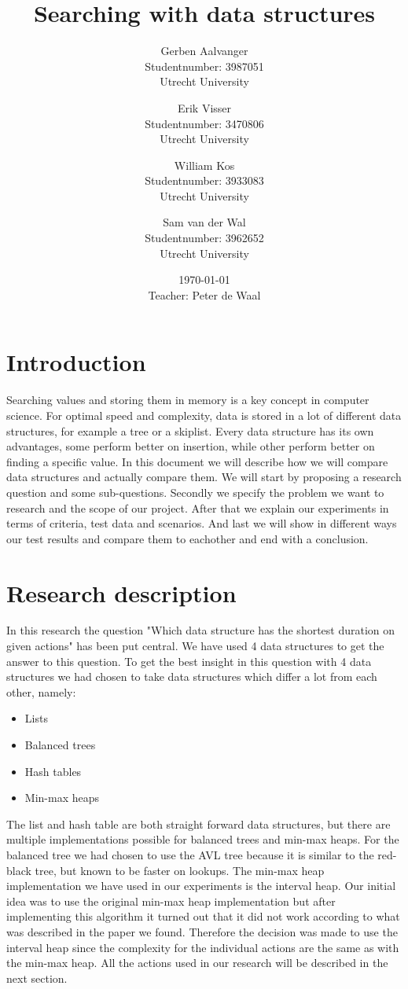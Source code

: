 \documentclass{article}
\title{Searching with data structures}
\author{
		Gerben Aalvanger\\ 
	        	Studentnumber: 3987051 \\
	        	Utrecht University
			\and
		Erik Visser\\
	        	Studentnumber: 3470806 \\
	        	Utrecht University
	        	\and
	        	William Kos\\
	        	Studentnumber: 3933083\\
	        	Utrecht University\\
	        	\and
	        	Sam van der Wal\\
	        	Studentnumber: 3962652\\
	        	Utrecht University}
\date{\today \\Teacher: Peter de Waal}
\begin{document}
\maketitle
\section{Introduction}
Searching values and storing them in memory is a key concept in computer science. For optimal speed and complexity, data is stored in a lot of different data structures, for example a tree or a skiplist. Every data structure has its own advantages, some perform better on insertion, while other perform better on finding a specific value. In this document we will describe how we will compare data structures and actually compare them. We will start by proposing a research question and some sub-questions. Secondly we specify the problem we want to research and the scope of our project. After that we explain our experiments in terms of criteria, test data and scenarios. And last we will show in different ways our test results and compare them to eachother and end with a conclusion. 

\section{Research description}
In this research the question "Which data structure has the shortest duration on given actions" has been put central. We have used 4 data structures to get the answer to this question. To get the best insight in this question with 4 data structures we had chosen to take data structures which differ a lot from each other, namely:
\begin{itemize}
\item Lists
\item Balanced trees
\item Hash tables
\item Min-max heaps
\end{itemize}
The list and hash table are both straight forward data structures, but there are multiple implementations possible for balanced trees and min-max heaps. For the balanced tree we had chosen to use the AVL tree because it is similar to the red-black tree, but known to be faster on lookups. The min-max heap implementation we have used in our experiments is the interval heap. Our initial idea was to use the original min-max heap implementation but after implementing this algorithm it turned out that it did not work according to what was described in the paper we found. Therefore the decision was made to use the interval heap since the complexity for the individual actions are the same as with the min-max heap. All the actions used in our research will be described in the next section.
\end{document}
